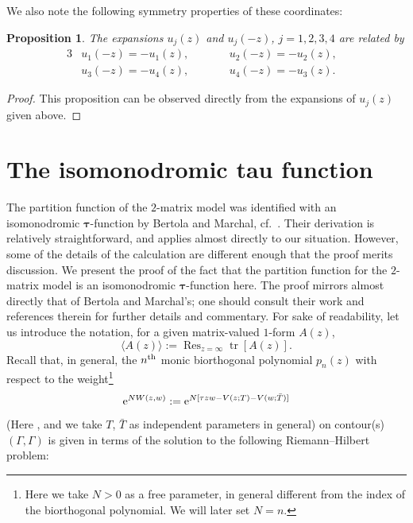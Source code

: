 \documentclass[10pt,a4paper]{amsart}
\DeclareMathOperator{\tr}{tr}
\DeclareMathOperator*{\Ress}{Res}
\newcommand{\Res}{\displaystyle\Ress}
\numberwithin{equation}{section}
\newtheorem{Proposition}[Theorem]{Proposition}
 { \theoremstyle{definition}
\newtheorem{Definition}[Theorem]{Definition}
\newtheorem{Note}[Theorem]{Note}
\newtheorem{Example}[Theorem]{Example}
\newtheorem{Remark}[Theorem]{Remark} }
\begin{document}
We also note the following symmetry properties of these coordinates:
 \begin{Proposition}
 The expansions $u_j(z)$ and $u_j(-z)$, $j=1,2,3,4$ are related by
 \begin{alignat*}{3}
 &u_1(-z) = -u_1(z), \qquad&& u_2(-z) = -u_2(z),&\\
 &u_3(-z) = -u_4(z), \qquad&& u_4(-z) = -u_3(z).&
 \end{alignat*}
 \end{Proposition}
\begin{proof}
 This proposition can be observed directly from the expansions of $u_j(z)$ given above.
\end{proof}





\section{The isomonodromic tau function} \label{Appendix-B}
 The partition function of the $2$-matrix model was identified with an isomonodromic $\boldsymbol{\tau}$-function by Bertola and Marchal,
 cf.~\cite{Bertola-Marchal}. Their derivation is relatively straightforward, and applies almost directly to our situation. However, some of
 the details of the calculation are different enough that the proof merits discussion. We present the proof of the fact
 that the partition function for the $2$-matrix model is an isomonodromic $\boldsymbol{\tau}$-function here. The proof mirrors almost directly that of
 Bertola and Marchal's; one should consult their work and references therein for further details and commentary.
 For sake of readability, let us introduce the notation, for a given matrix-valued $1$-form $A(z)$,
 \begin{equation*}
 \langle A(z) \rangle := \Res_{z=\infty} \tr [ A(z)].
 \end{equation*}
 Recall that, in general, the $n^{\rm th}$ monic biorthogonal polynomial $p_n(z)$ with respect to the weight\footnote{Here we take $N >0$ as a free parameter, in general different from the index of the biorthogonal polynomial. We will later set $N=n$.}
 \begin{equation*}
 {\rm e}^{N W(z,w)} := {\rm e}^{N[\tau zw - V(z;T) - V(w;\bar{T})]}
 \end{equation*}
 \big(Here , and we take $T$, $\bar{T}$ as independent parameters in general\big) on contour(s) $(\Gamma,\Gamma)$
 is given in terms of the solution to the following Riemann--Hilbert problem:
\end{document}
